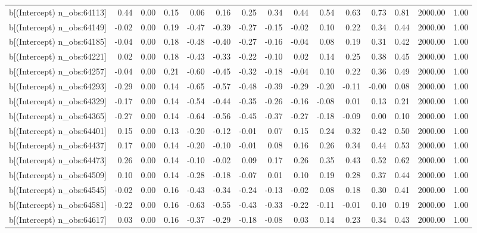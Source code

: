 \begin{table}[ht]
\begin{tabular}{rrrrrrrrrrrrrrr}
  b[(Intercept) n\_obs:64113] & 0.44 & 0.00 & 0.15 & 0.06 & 0.16 & 0.25 & 0.34 & 0.44 & 0.54 & 0.63 & 0.73 & 0.81 & 2000.00 & 1.00 \\ 
  b[(Intercept) n\_obs:64149] & -0.02 & 0.00 & 0.19 & -0.47 & -0.39 & -0.27 & -0.15 & -0.02 & 0.10 & 0.22 & 0.34 & 0.44 & 2000.00 & 1.00 \\ 
  b[(Intercept) n\_obs:64185] & -0.04 & 0.00 & 0.18 & -0.48 & -0.40 & -0.27 & -0.16 & -0.04 & 0.08 & 0.19 & 0.31 & 0.42 & 2000.00 & 1.00 \\ 
  b[(Intercept) n\_obs:64221] & 0.02 & 0.00 & 0.18 & -0.43 & -0.33 & -0.22 & -0.10 & 0.02 & 0.14 & 0.25 & 0.38 & 0.45 & 2000.00 & 1.00 \\ 
  b[(Intercept) n\_obs:64257] & -0.04 & 0.00 & 0.21 & -0.60 & -0.45 & -0.32 & -0.18 & -0.04 & 0.10 & 0.22 & 0.36 & 0.49 & 2000.00 & 1.00 \\ 
  b[(Intercept) n\_obs:64293] & -0.29 & 0.00 & 0.14 & -0.65 & -0.57 & -0.48 & -0.39 & -0.29 & -0.20 & -0.11 & -0.00 & 0.08 & 2000.00 & 1.00 \\ 
  b[(Intercept) n\_obs:64329] & -0.17 & 0.00 & 0.14 & -0.54 & -0.44 & -0.35 & -0.26 & -0.16 & -0.08 & 0.01 & 0.13 & 0.21 & 2000.00 & 1.00 \\ 
  b[(Intercept) n\_obs:64365] & -0.27 & 0.00 & 0.14 & -0.64 & -0.56 & -0.45 & -0.37 & -0.27 & -0.18 & -0.09 & 0.00 & 0.10 & 2000.00 & 1.00 \\ 
  b[(Intercept) n\_obs:64401] & 0.15 & 0.00 & 0.13 & -0.20 & -0.12 & -0.01 & 0.07 & 0.15 & 0.24 & 0.32 & 0.42 & 0.50 & 2000.00 & 1.00 \\ 
  b[(Intercept) n\_obs:64437] & 0.17 & 0.00 & 0.14 & -0.20 & -0.10 & -0.01 & 0.08 & 0.16 & 0.26 & 0.34 & 0.44 & 0.53 & 2000.00 & 1.00 \\ 
  b[(Intercept) n\_obs:64473] & 0.26 & 0.00 & 0.14 & -0.10 & -0.02 & 0.09 & 0.17 & 0.26 & 0.35 & 0.43 & 0.52 & 0.62 & 2000.00 & 1.00 \\ 
  b[(Intercept) n\_obs:64509] & 0.10 & 0.00 & 0.14 & -0.28 & -0.18 & -0.07 & 0.01 & 0.10 & 0.19 & 0.28 & 0.37 & 0.44 & 2000.00 & 1.00 \\ 
  b[(Intercept) n\_obs:64545] & -0.02 & 0.00 & 0.16 & -0.43 & -0.34 & -0.24 & -0.13 & -0.02 & 0.08 & 0.18 & 0.30 & 0.41 & 2000.00 & 1.00 \\ 
  b[(Intercept) n\_obs:64581] & -0.22 & 0.00 & 0.16 & -0.63 & -0.55 & -0.43 & -0.33 & -0.22 & -0.11 & -0.01 & 0.10 & 0.19 & 2000.00 & 1.00 \\ 
  b[(Intercept) n\_obs:64617] & 0.03 & 0.00 & 0.16 & -0.37 & -0.29 & -0.18 & -0.08 & 0.03 & 0.14 & 0.23 & 0.34 & 0.43 & 2000.00 & 1.00 \\ 

\end{tabular}
\end{table}
